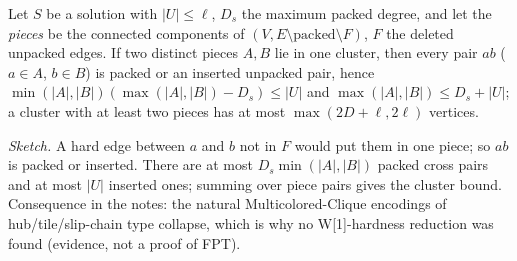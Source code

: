 \begin{claim}\label{cl:sm}
Let $S$ be a solution with $|U|\le\ell$, $D_s$ the maximum packed degree, and let the \emph{pieces} be the connected components of $(V,E\setminus\text{packed}\setminus F)$, $F$ the deleted unpacked edges. If two distinct pieces $A,B$ lie in one cluster, then every pair $ab$ ($a\in A$, $b\in B$) is packed or an inserted unpacked pair, hence $\min(|A|,|B|)(\max(|A|,|B|)-D_s)\le|U|$ and $\max(|A|,|B|)\le D_s+|U|$; a cluster with at least two pieces has at most $\max(2D+\ell,2\ell)$ vertices.
\end{claim}
\emph{Sketch.} A hard edge between $a$ and $b$ not in $F$ would put them in one piece; so $ab$ is packed or inserted. There are at most $D_s\min(|A|,|B|)$ packed cross pairs and at most $|U|$ inserted ones; summing over piece pairs gives the cluster bound. Consequence in the notes: the natural Multicolored-Clique encodings of hub/tile/slip-chain type collapse, which is why no W[1]-hardness reduction was found (evidence, not a proof of FPT).
